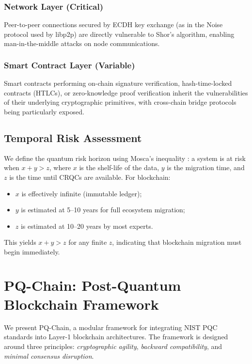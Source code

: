 \documentclass[12pt, a4paper, twocolumn]{article}
\begin{document}
\subsubsection{Network Layer (Critical)}
Peer-to-peer connections secured by ECDH key exchange (as in the Noise protocol used by libp2p) are directly vulnerable to Shor's algorithm, enabling man-in-the-middle attacks on node communications.

\subsubsection{Smart Contract Layer (Variable)}
Smart contracts performing on-chain signature verification, hash-time-locked contracts (HTLCs), or zero-knowledge proof verification inherit the vulnerabilities of their underlying cryptographic primitives, with cross-chain bridge protocols being particularly exposed.

\subsection{Temporal Risk Assessment}

We define the quantum risk horizon using Mosca's inequality \cite{mosca2018cybersecurity}: a system is at risk when $x + y > z$, where $x$ is the shelf-life of the data, $y$ is the migration time, and $z$ is the time until CRQCs are available. For blockchain:
\begin{itemize}[noitemsep]
  \item $x$ is effectively infinite (immutable ledger);
  \item $y$ is estimated at 5--10 years for full ecosystem migration;
  \item $z$ is estimated at 10--20 years by most experts.
\end{itemize}

This yields $x + y > z$ for any finite $z$, indicating that blockchain migration must begin immediately.

\section{PQ-Chain: Post-Quantum Blockchain Framework}
\label{sec:framework}

We present PQ-Chain, a modular framework for integrating NIST PQC standards into Layer-1 blockchain architectures. The framework is designed around three principles: \emph{cryptographic agility}, \emph{backward compatibility}, and \emph{minimal consensus disruption}.
\end{document}
